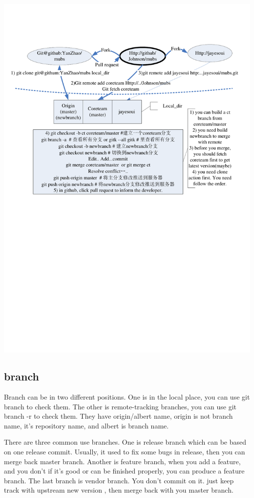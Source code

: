 \documentclass[a4paper,12pt,twoside]{book}
\begin{document}
    \includegraphics[scale=0.7]{pics/Visio-git_cooperate}


\subsection{ branch}

Branch can be in  two different positions. One is in the local place, you can use git branch to check them. The
other is remote-tracking branches, you can use git branch -r to check them. They have origin/albert name, origin
is not branch name, it's repository  name, and albert is branch name. \par

There are three common use branches. One is release branch which can be based on one release commit.
Usually, it used to fix some bugs in release, then you can merge back master branch. Another is feature branch,
when you add a feature, and you don't if it's good or can be finished properly, you can produce a feature branch.
The last branch is vendor branch. You don't commit on it. just keep track with upstream new version , then
merge back with you master branch.
\end{document}

